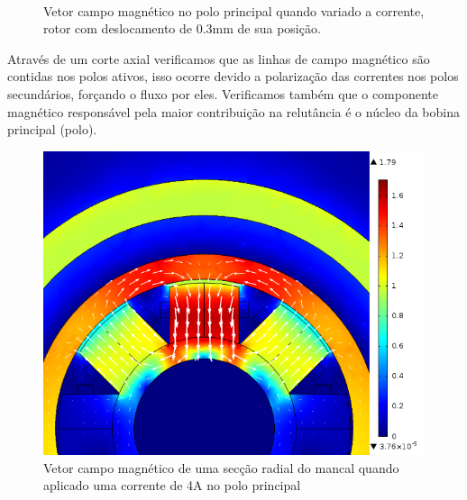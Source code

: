 \begin{figure}[!ht]
	\centering
		\\
	\caption{Vetor campo magnético no polo principal quando variado a corrente, rotor com deslocamento de 0.3mm de sua posição.}
	\label{fig:ativo:fem:b:polos}
\end{figure}

Através de um corte axial verificamos que as linhas de campo magnético são contidas nos polos ativos, isso ocorre devido a polarização das correntes nos polos secundários, forçando o fluxo por eles. Verificamos também que o componente magnético responsável pela maior contribuição na relutância é o núcleo da bobina principal (polo).

\begin{figure}
\centering
\includegraphics[width=0.8\linewidth]{Figs/Simulacoes/Ativo/Cima_dx=03_I=4}
\caption{Vetor campo magnético de uma secção radial do mancal quando aplicado uma corrente de 4A no polo principal}
\label{fig:ativo:fem:b:radial}
\end{figure}




